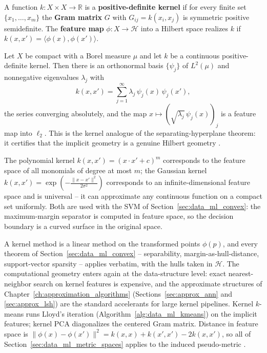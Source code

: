 \begin{definition}\label{def:data_ml_kernel}
  A function $k : X \times X \to \mathbb{R}$ is a \textbf{positive-definite
  kernel} if for every finite set $\{x_1, \dots, x_m\}$ the
  \textbf{Gram matrix} $G$ with $G_{ij} = k(x_i, x_j)$ is symmetric positive
  semidefinite. The \textbf{feature map}
  $\phi : X \to \mathcal{H}$ into a Hilbert space realizes $k$ if
  $k(x, x') = \langle \phi(x), \phi(x') \rangle$.
\end{definition}

\begin{theorem}\label{thm:data_ml_mercer}
  Let $X$ be compact with a Borel measure $\mu$ and let $k$ be a continuous
  positive-definite kernel. Then there is an orthonormal basis
  $\{\psi_j\}$ of $L^2(\mu)$ and nonnegative eigenvalues $\lambda_j$ with
  \[
    k(x, x') = \sum_{j=1}^{\infty} \lambda_j\, \psi_j(x)\, \psi_j(x'),
  \]
  the series converging absolutely, and the map
  $x \mapsto (\sqrt{\lambda_j}\,\psi_j(x))_j$ is a feature map into
  $\ell_2$. This is the kernel analogue of the separating-hyperplane
  theorem: it certifies that the implicit geometry is a genuine Hilbert
  geometry \cite{muller2001,bishop2006}.
\end{theorem}

\begin{example}\label{ex:data_ml_kernels}
  The polynomial kernel $k(x,x') = (x \cdot x' + c)^m$ corresponds to the
  feature space of all monomials of degree at most $m$; the Gaussian kernel
  $k(x,x') = \exp(-\frac{\|x - x'\|^2}{2\sigma^2})$ corresponds to an
  infinite-dimensional feature space and is universal -- it can approximate
  any continuous function on a compact set uniformly. Both are used with the
  SVM of Section~\ref{sec:data_ml_convex}: the maximum-margin separator is
  computed in feature space, so the decision boundary is a curved surface in
  the original space.
\end{example}

\begin{remark}
  A kernel method is a linear method on the transformed points
  $\phi(p)$, and every theorem of Section~\ref{sec:data_ml_convex} --
  separability, margin-as-hull-distance, support-vector sparsity -- applies
  verbatim, with the hulls taken in $\mathcal{H}$. The computational
  geometry enters again at the data-structure level: exact nearest-neighbor
  search on kernel features is expensive, and the approximate structures of
  Chapter~\ref{ch:approximation_algorithms}
  (Sections~\ref{sec:approx_ann} and \ref{sec:approx_lsh}) are the standard
  accelerants for large kernel pipelines. Kernel $k$-means runs Lloyd's
  iteration (Algorithm~\ref{alg:data_ml_kmeans}) on the implicit features;
  kernel PCA diagonalizes the centered Gram matrix. Distance in feature
  space is $\| \phi(x) - \phi(x') \|^2 = k(x,x) + k(x',x') - 2k(x,x')$, so
  all of Section~\ref{sec:data_ml_metric_spaces} applies to the induced
  pseudo-metric \cite{muller2001}.
\end{remark}

